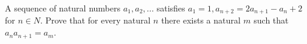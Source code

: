 A sequence of natural numbers $a_1,a_2,...$ satisfies $a_1 = 1, a_{n+2} = 2a_{n+1} - a_n +2$ for $n \in N$.
Prove that for every natural $n$ there exists a natural $m$ such that $a_na_{n+1} = a_m$.